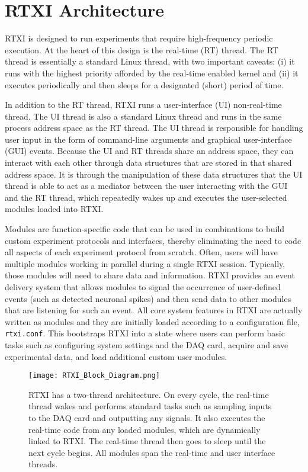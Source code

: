\section{RTXI Architecture}

RTXI is designed to run experiments that require high-frequency periodic execution. At the heart of this design is the real-time (RT) thread. The RT thread is essentially a standard Linux thread, with two important caveats: (i) it runs with the highest priority afforded by the real-time enabled kernel and (ii) it executes periodically and then sleeps for a designated (short) period of time.

In addition to the RT thread, RTXI runs a user-interface (UI) non-real-time thread. The UI thread is also a standard Linux thread and runs in the same process address space as the RT thread. The UI thread is responsible for handling user input in the form of command-line arguments and graphical user-interface (GUI) events. Because the UI and RT threads share an address space, they can interact with each other through data structures that are stored in that shared address space. It is through the manipulation of these data structures that the UI thread is able to act as a mediator between the user interacting with the GUI and the RT thread, which repeatedly wakes up and executes the user-selected modules loaded into RTXI. 

Modules are function-specific code that can be used in combinations to build custom experiment protocols and interfaces, thereby eliminating the need to code all aspects of each experiment protocol from scratch. Often, users will have multiple modules working in parallel during a single RTXI session. Typically, those modules will need to share data and information. RTXI provides an event delivery system that allows modules to signal the occurrence of user-defined events (such as detected neuronal spikes) and then send data to other modules that are listening for such an event. All core system features in RTXI are actually written as modules and they are initially loaded according to a configuration file, \texttt{rtxi.conf}. This bootstraps RTXI into a state where users can perform basic tasks such as configuring system settings and the DAQ card, acquire and save experimental data, and load additional custom user modules.



\begin{figure}[h]
\begin{maxipage}
\begin{center}
\texttt{[image: RTXI\_Block\_Diagram.png]} 
\caption[RTXI Architecture]{RTXI has a two-thread architecture. On every cycle, the real-time thread wakes and performs standard tasks such as sampling inputs to the DAQ card and outputting any signals. It also executes the real-time code from any loaded modules, which are dynamically linked to RTXI. The real-time thread then goes to sleep until the next cycle begins. All modules span the real-time and user interface threads.} 
\end{center}
\end{maxipage}
\end{figure}

